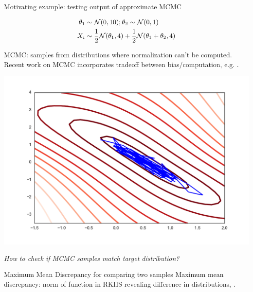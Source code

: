 

\begin{frame}
\begin{columns}
\begin{column}{.33\linewidth}
\begin{block}{Motivating example: testing output of approximate MCMC}
\begin{minipage}{.49\linewidth}

\begin{align*}
 \theta_{1}&\sim{\cal N}(0,10);\theta_{2}\sim{\cal N}(0,1) \\
 X_{i} &\sim\frac{1}{2}{\cal N}(\theta_{1},4)+\frac{1}{2}{\cal N}(\theta_{1}+\theta_{2},4)
\end{align*}
 \vspace{1cm} 


MCMC: samples from distributions where normalization can't be computed.
Recent work on MCMC  incorporates tradeoff between bias/computation, e.g. \cite{korattikara2013austerity}.
\end{minipage}
\begin{minipage}{.4\linewidth}
\includegraphics[scale=0.65]{../../presentation/img/sgld_trace_and_density.pdf}
\end{minipage}
\vspace{1cm}
\begin{center}
{\large\emph{How to check if MCMC samples match target distribution?}}
\end{center}
\end{block}
\vspace{-0.75cm}
\begin{block}{Maximum Mean Discrepancy for comparing two samples}
Maximum mean discrepancy: norm of function in RKHS revealing difference in distributions, \cite{gretton2012kernel}.


\end{block}
\end{column}
\end{columns}
\end{frame}
